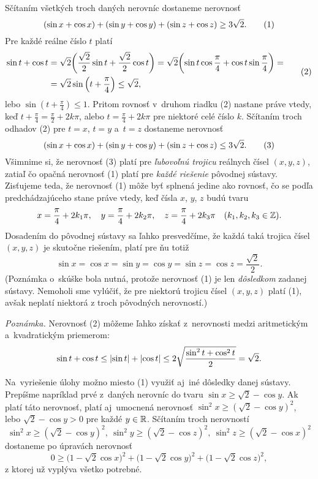 {%
Sčítaním všetkých troch daných nerovníc dostaneme nerovnosť
$$
(\sin x+\cos x)+(\sin y+\cos y)+(\sin z+\cos z)\geq3\sqrt{2}.
\tag1
$$
Pre každé reálne číslo $t$ platí
$$
\aligned
\sin t+\cos t&=\sqrt{2}\biggl(\frac{\sqrt{2}}{2}\sin t+
\frac{\sqrt{2}}{2}\cos t\biggr)=\sqrt{2}\biggl(\sin t\cos\frac{\pi}{4}+
\cos t\sin\frac{\pi}{4}\biggr)=\\
&=\sqrt{2}\sin\left(t+\frac{\pi}{4}\right)\leq\sqrt{2},
\endaligned
\tag2
$$
lebo $\sin\left(t+\frac{\pi}{4}\right)\leq1$. Pritom rovnosť
v~druhom riadku (2) nastane práve vtedy, keď
$t+\frac{\pi}{4}=\frac{\pi}{2}+2k\pi$, alebo $t=\frac{\pi}{4}+2k\pi$
pre niektoré celé číslo $k$. Sčítaním troch odhadov (2) pre $t=x$,
$t=y$ a~$t=z$ dostaneme nerovnosť
$$
(\sin x+\cos x)+(\sin y+\cos y)+(\sin z+\cos z)\leq3\sqrt{2}.
\tag3$$
Všimnime si, že nerovnosť (3) platí pre {\it ľubovoľnú trojicu\/}
reálnych čísel $(x,y,z)$, zatiaľ čo opačná nerovnosť (1) platí pre
{\it každé riešenie\/} pôvodnej sústavy. Zisťujeme teda,
že nerovnosť (1) môže byť splnená jedine ako rovnosť, čo se
podľa predchádzajúceho stane práve vtedy, keď čísla $x$, $y$, $z$ budú tvaru
$$
x=\frac{\pi}{4}+2k_1\pi,\quad y=\frac{\pi}{4}+2k_2\pi,\quad
z=\frac{\pi}{4}+2k_3\pi\quad (k_1,k_2,k_3\in\Bbb Z).
$$
Dosadením do pôvodnej sústavy sa ľahko presvedčíme, že každá
taká trojica čísel $(x,y,z)$ je skutočne riešením, platí pre ňu totiž
$$
\sin x=\cos x=\sin y=\cos y=\sin z=\cos z=\frac{\sqrt{2}}{2}.
$$
(Poznámka o~skúške bola nutná, protože nerovnosť (1) je len {\it
dôsledkom\/} zadanej sústavy. Nemoholi sme vylúčiť, že
pre niektorú trojicu čísel $(x,y,z)$ platí (1), avšak neplatí
niektorá z troch pôvodných nerovností.)

\medskip
{\it Poznámka.}
Nerovnosť (2) môžeme ľahko získať z~nerovnosti medzi aritmetickým
a~kvadratickým priemerom:
$$
\sin t+\cos t\le\mathopen|\sin t|+\mathopen|\cos t|\le
2\sqrt{\sin^2t+\cos^2t\over2}=\sqrt2.
$$

Na~vyriešenie úlohy možno miesto (1) využiť aj~iné
dôsledky danej sústavy. Prepíšme napríklad prvé z~daných
nerovníc do tvaru $\sin x\geq\sqrt{2}-\cos y$. Ak platí táto
nerovnosť, platí aj~umocnená nerovnosť
$\sin^2 x\geq(\sqrt{2}-\cos y)^2$, lebo $\sqrt{2}-\cos y>0$ pre
každé $y\in\Bbb R$. Sčítaním troch nerovností
$$
\sin^2 x\geq(\sqrt{2}-\cos y)^2,\
\sin^2 y\geq(\sqrt{2}-\cos z)^2,\
\sin^2 z\geq(\sqrt{2}-\cos x)^2
$$
dostaneme po úpravách nerovnosť
$$
0\geq\bigl(1-\sqrt{2}\cos x\bigr)^2+
\bigl(1-\sqrt{2}\cos y\bigr)^2+
\bigl(1-\sqrt{2}\cos z\bigr)^2,
$$
z ktorej už vyplýva všetko potrebné.

}
